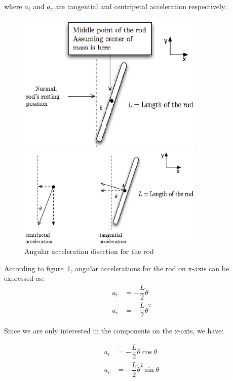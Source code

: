 \documentclass{notes}
\begin{document}
where $a_t$ and $a_c$ are tangential and centripetal acceleration respectively. 

\begin{figure}[!h]
  \begin{center}
    \begin{minipage}[b]{3.5in}
      \centerline{\mbox{\includegraphics[width=3.5in]{pics/rod.eps}}}
    \end{minipage}
    \begin{minipage}[b]{3.5in}
      \centerline{\mbox{\includegraphics[width=3.5in]{pics/rod_acceleration.eps}}}
    \end{minipage}
    
  \end{center}
  \caption{Angular acceleration disection for the rod}
  \label{fig:angular_rod}
\end{figure}

According to figure~\ref{fig:angular_rod}, angular accelerations for the rod on x-axis can be
expressed as:
\begin{align*}
  a_t & = -\dfrac{L}{2} \ddot{\theta} \\
  a_c & = -\dfrac{L}{2} \dot{\theta}^2
\end{align*}

Since we are only interested in the components on the x-axis, we have:

\begin{align*}
  a_t & = -\dfrac{L}{2} \ddot{\theta} \cos \theta \\
  a_c & = -\dfrac{L}{2} \dot{\theta}^2 \sin \theta
\end{align*}
\end{document}
